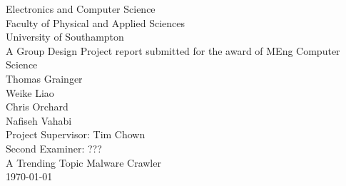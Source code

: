 \begin{titlepage}

\begin{center}

{\large Electronics and Computer Science\\
Faculty of Physical and Applied Sciences\\
University of Southampton}\\[5em]

{\large A Group Design Project report submitted for the award of MEng
Computer Science}\\[5em]

{\large Thomas Grainger}\\
{\large Weike Liao}\\
{\large Chris Orchard}\\
{\large Nafiseh Vahabi}\\[5em]

{\large Project Supervisor: Tim Chown\\
Second Examiner: ???}\\[5em]

{\LARGE A Trending Topic Malware Crawler}\\[5em]
{\large \today}\\[5em]


\end{center}

\end{titlepage}
